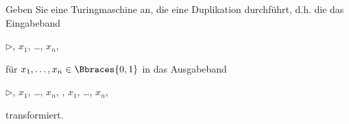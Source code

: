 
\begin{exercise}

Geben Sie eine Turingmaschine an, die eine Duplikation durchführt, d.h. die das Eingabeband

\begin{center}

    {
        {
            $\triangleright$,
            $x_1$,
            \dots,
            $x_n$,
            \textvisiblespace
        }
    }

\end{center}    

für $x_1, \dots, x_n \in \Bbraces{0, 1}$ in das Ausgabeband

\begin{center}

    {
        {
            $\triangleright$,
            $x_1$,
            \dots,
            $x_n$,
            \textvisiblespace,
            $x_1$,
            \dots,
            $x_n$,
            \textvisiblespace
        }
    }

\end{center}    

transformiert.

\end{exercise}


